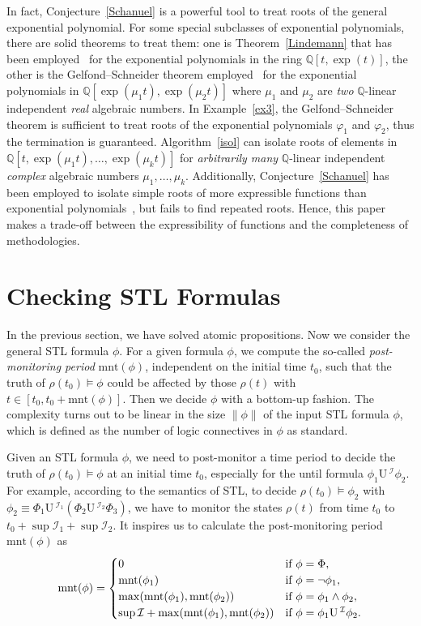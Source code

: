 \documentclass[a4paper,UKenglish,cleveref,autoref,thm-restate,authorcolumns]{lipics-v2019}
\newcommand{\I}{\mathcal{I}}
\newcommand{\ntl}{\mathrm{U}\,}
\newcommand{\mnt}{\mathrm{mnt}}
\begin{document}
In fact, Conjecture~\ref{Schanuel} is a powerful tool
to treat roots of the general exponential polynomial.
For some special subclasses of exponential polynomials,
there are solid theorems to treat them:
one is Theorem~\ref{Lindemann} that has been employed~\cite{AMW08}
for the exponential polynomials in the ring $\mathbb{Q}[t,\exp(t)]$,
the other is the Gelfond--Schneider theorem employed~\cite[Subsection~4.1]{HLX+18}
for the exponential polynomials in $\mathbb{Q}[\exp(\mu_1 t),\exp(\mu_2 t)]$
where $\mu_1$ and $\mu_2$ are
\emph{two} $\mathbb{Q}$-linear independent \emph{real} algebraic numbers.
In Example~\ref{ex3}, the Gelfond--Schneider theorem is sufficient to
treat roots of the exponential polynomials $\varphi_1$ and $\varphi_2$,
thus the termination is guaranteed.
Algorithm~\ref{isol} can isolate roots of elements in
$\mathbb{Q}[t,\exp(\mu_1 t),\ldots,\exp(\mu_k t)]$
for \emph{arbitrarily many} $\mathbb{Q}$-linear independent
\emph{complex} algebraic numbers $\mu_1,\ldots,\mu_k$.
Additionally, Conjecture~\ref{Schanuel} has been employed
to isolate simple roots of more expressible functions
than exponential polynomials~\cite{Str08,Str09},
but fails to find repeated roots.
Hence, this paper makes a trade-off
between the expressibility of functions and the completeness of methodologies.

	
\section{Checking STL Formulas}\label{S6}
In the previous section, we have solved atomic propositions.
Now we consider the general STL formula $\phi$.
For a given formula $\phi$,
we compute the so-called \emph{post-monitoring period} $\mnt(\phi)$,
independent on the initial time $t_0$,
such that the truth of $\rho(t_0)\models\phi$ could be affected
by those $\rho(t)$ with $t \in [t_0,t_0+\mnt(\phi)]$.
Then we decide $\phi$ with a bottom-up fashion.
The complexity turns out to be linear in the size $\|\phi\|$ of the input STL formula $\phi$,
which is defined as the number of logic connectives in $\phi$ as standard.

Given an STL formula $\phi$,
we need to post-monitor a time period to decide the truth of $\rho(t_0)\models\phi$
at an initial time $t_0$,
especially for the until formula $\phi_1 \ntl^\I \phi_2$.
For example, according to the semantics of STL,
to decide $\rho(t_0)\models \phi_2$
with $\phi_2 \equiv \Phi_1 \ntl^{\I_1} (\Phi_2 \ntl^{\I_2} \Phi_3)$,
we have to monitor the states $\rho(t)$ from time $t_0$ to $t_0+\sup\I_1+\sup\I_2$.
It inspires us
to calculate the post-monitoring period $\mnt(\phi)$ as
\begin{equation}\label{mnt}
	\mnt(\phi)=\begin{cases}
		0 & \textup{if }\phi=\Phi, \\
		\mnt(\phi_1) & \textup{if }\phi=\neg\phi_1, \\
		\max(\mnt(\phi_1),\mnt(\phi_2))	& \textup{if }\phi=\phi_1 \wedge \phi_2, \\
		\sup\I+\max(\mnt(\phi_1),\mnt(\phi_2)) & \textup{if }\phi=\phi_1 \ntl^\I \phi_2.
	\end{cases}
\end{equation}
\end{document}
